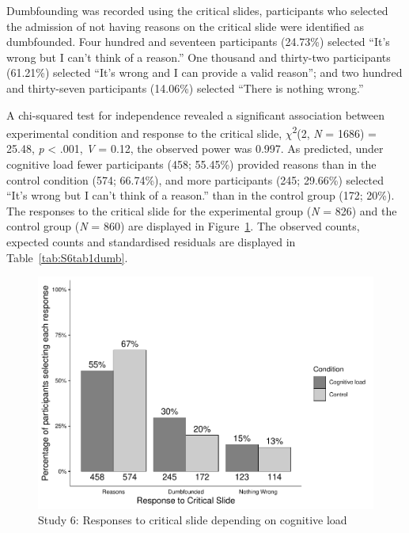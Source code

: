\documentclass[
  american,
  man]{apa7}
\begin{document}
Dumbfounding was recorded using the critical slides, participants who selected the admission of not having reasons on the critical slide were identified as dumbfounded. Four hundred and seventeen participants (24.73\%) selected ``It's wrong but I can't think of a reason.'' One thousand and thirty-two participants (61.21\%) selected ``It's wrong and I can provide a valid reason''; and two hundred and thirty-seven participants (14.06\%) selected ``There is nothing wrong.''

A chi-squared test for independence revealed a significant association between experimental condition and response to the critical slide, \(\chi\)\textsuperscript{2}(2, \emph{N} = 1686) = 25.48, \emph{p} \textless{} .001, \emph{V} = 0.12, the observed power was 0.997. As predicted, under cognitive load fewer participants (458; 55.45\%) provided reasons than in the control condition (574; 66.74\%), and more participants (245; 29.66\%) selected ``It's wrong but I can't think of a reason.'' than in the control group (172; 20\%). The responses to the critical slide for the experimental group (\emph{N} = 826) and the control group (\emph{N} = 860) are displayed in Figure~\ref{fig:S6ch5S6fig1criticalconditionb}. The observed counts, expected counts and standardised residuals are displayed in Table~\ref{tab:S6tab1dumb}.

\newpage

\begin{figure}
\centering
\includegraphics{Study_6_files/figure-latex/S6ch5S6fig1criticalconditionb-1.pdf}
\caption{\label{fig:S6ch5S6fig1criticalconditionb}Study 6: Responses to critical slide depending on cognitive load}
\end{figure}
\end{document}
